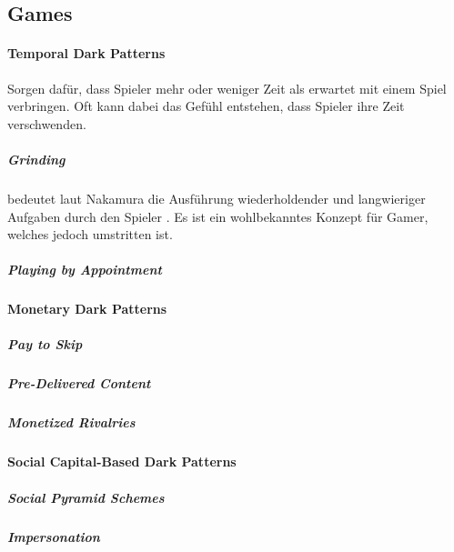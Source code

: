 \documentclass[a4paper]{article}
\begin{document}
\subsection{Games}
\label{sub:games}

\paragraph{Temporal Dark Patterns}
Sorgen dafür, dass Spieler mehr oder weniger Zeit als erwartet mit einem Spiel verbringen. Oft kann dabei das Gefühl entstehen, dass Spieler ihre Zeit verschwenden.

\subparagraph{Grinding} bedeutet laut Nakamura die Ausführung wiederholdender und langwieriger Aufgaben durch den Spieler \cite{nakamura}. Es ist ein wohlbekanntes Konzept für Gamer, welches jedoch umstritten ist.

\subparagraph{Playing by Appointment}

\paragraph{Monetary Dark Patterns}

\subparagraph{Pay to Skip}

\subparagraph{Pre-Delivered Content}

\subparagraph{Monetized Rivalries}

\paragraph{Social Capital-Based Dark Patterns}

\subparagraph{Social Pyramid Schemes}

\subparagraph{Impersonation}
\end{document}
